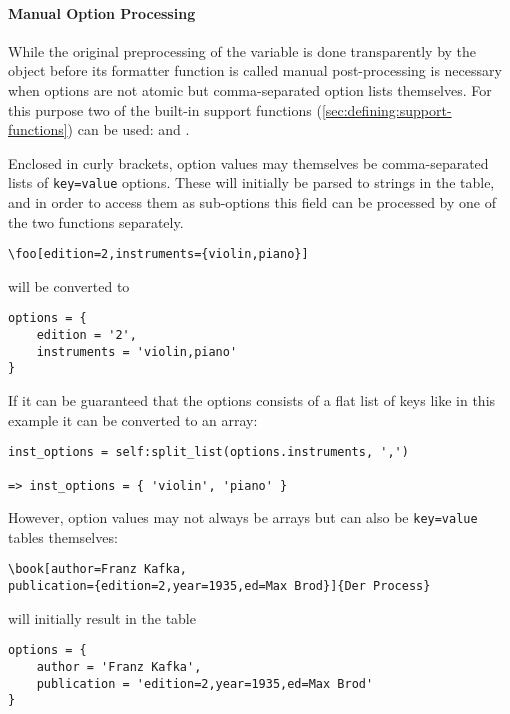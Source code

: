 \documentclass[12pt]{scrartcl}
\begin{document}
\paragraph{Manual Option Processing}

While the original preprocessing of the  variable is done
transparently by the  object before its formatter function is
called manual post-processing is necessary when options are not atomic but
comma-separated option lists themselves.  For this purpose two of the built-in
support functions (\vref{sec:defining:support-functions}) can be used:
 and .

Enclosed in curly brackets, option values may themselves be comma-separated
lists of \texttt{key=value} options. These will initially be parsed to strings
in the  table, and in order to access them as sub-options this
field can be processed by one of the two functions separately.

\begin{verbatim}
\foo[edition=2,instruments={violin,piano}]
\end{verbatim}

\noindent will be converted to

\begin{verbatim}
options = {
	edition = '2',
	instruments = 'violin,piano'
}
\end{verbatim}

\noindent If it can be guaranteed that the options consists of a flat list of
keys like in this example it can be converted to an array:

\begin{verbatim}
inst_options = self:split_list(options.instruments, ',')

=> inst_options = { 'violin', 'piano' }
\end{verbatim}

\noindent However, option values may not always be arrays but can also be
\texttt{key=value} tables themselves:

\begin{verbatim}
\book[author=Franz Kafka,
publication={edition=2,year=1935,ed=Max Brod}]{Der Process}
\end{verbatim}

\noindent will initially result in the table

\begin{verbatim}
options = {
	author = 'Franz Kafka',
	publication = 'edition=2,year=1935,ed=Max Brod'
}
\end{verbatim}
\end{document}
